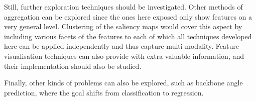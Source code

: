 Still, further exploration techniques should be investigated. Other methods of aggregation can be explored since the ones here exposed only show features on a very general level. Clustering of the saliency maps would cover this aspect by including various facets of the features to each of which all techniques developed here can be applied independently and thus capture multi-modality. Feature visualisation techniques can also provide with extra valuable information, and their implementation should also be studied.

Finally, other kinds of problems can also be explored, such as backbone angle prediction, where the goal shifts from classification to regression.